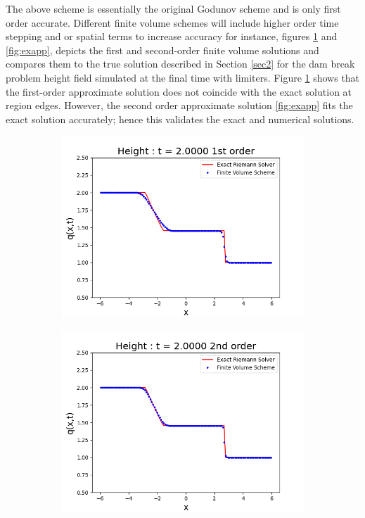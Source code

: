 \documentclass[10pt,a4paper]{article}
\begin{document}
The above  scheme is essentially the original Godunov scheme \cite{godunov1959difference} and is only first order accurate.  Different finite volume schemes will include higher order time stepping and or spatial terms to increase accuracy for instance, figures \ref{fig:exap} and \ref{fig:exapp}, depicts the first and second-order finite volume solutions and compares them to the true solution described in Section \ref{sec2} for the dam break problem height field simulated at the final time with limiters. Figure \ref{fig:exap}  shows that the first-order approximate solution does not coincide with the exact solution at region edges. However, the second order approximate solution \ref{fig:exapp}  fits the exact solution accurately; hence this validates the exact and numerical solutions.
	\begin{figure}[H]
		\begin{subfigure}[b]{0.5\textwidth}
			\centering
			\includegraphics[width=1.0\linewidth]{images/exap}
			\caption{}
			\label{fig:exap}
		\end{subfigure}
		\begin{subfigure}[b]{0.5\textwidth}
			\centering
			\includegraphics[width=1.0\linewidth]{images/exapp}

\end{subfigure}
\end{figure}
\end{document}
